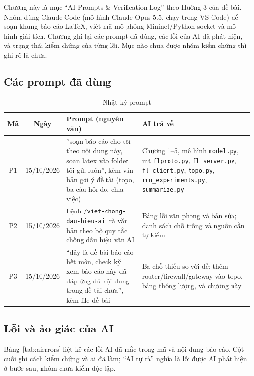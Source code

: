 \setcounter{section}{6}
\setcounter{equation}{0}
Chương này là mục ``AI Prompts \& Verification Log'' theo Hướng 3 của đề bài. Nhóm dùng Claude Code (mô hình Claude Opus 5.5, chạy trong VS Code) để soạn khung báo cáo LaTeX, viết mã mô phỏng Mininet/Python socket và mô hình giải tích. Chương ghi lại các prompt đã dùng, các lỗi của AI đã phát hiện, và trạng thái kiểm chứng của từng lỗi. Mục nào chưa được nhóm kiểm chứng thì ghi rõ là chưa.

\subsection{Các prompt đã dùng}
\begin{table}[H]
    \centering
    \caption{Nhật ký prompt}
    \label{tab:prompts}
    \begin{tabularx}{\textwidth}{c c >{\raggedright\arraybackslash\hsize=1.1\hsize}X >{\raggedright\arraybackslash\hsize=0.9\hsize}X}
        \toprule
        \textbf{Mã} & \textbf{Ngày} & \textbf{Prompt (nguyên văn)} & \textbf{AI trả về} \\
        \midrule
        P1 & 15/10/2026 & ``soạn báo cáo cho tôi theo nội dung này, soạn latex vào folder tôi gửi luôn'', kèm văn bản gợi ý đề tài (topo, ba câu hỏi đo, chia việc) & Chương 1--5, mô hình \texttt{model.py}, mã \texttt{flproto.py}, \texttt{fl\_server.py}, \texttt{fl\_client.py}, \texttt{topo.py}, \texttt{run\_experiments.py}, \texttt{summarize.py} \\
        \midrule
        P2 & 15/10/2026 & Lệnh \texttt{/viet-chong-dau-hieu-ai}: rà văn bản theo bộ quy tắc chống dấu hiệu văn AI & Bảng lỗi văn phong và bản sửa; danh sách chỗ trống và nguồn cần tự kiểm \\
        \midrule
        P3 & 15/10/2026 & ``đây là đề bài báo cáo hết môn, check kỹ xem báo cáo này đã đáp ứng đủ nội dung trong đề tài chưa'', kèm file đề bài & Ba chỗ thiếu so với đề; thêm router/firewall/gateway vào topo, bảng thông lượng, và chương này \\
        \bottomrule
    \end{tabularx}
\end{table}

\subsection{Lỗi và ảo giác của AI}
Bảng~\ref{tab:aierrors} liệt kê các lỗi AI đã mắc trong mã và nội dung báo cáo. Cột cuối ghi cách kiểm chứng và ai đã làm; ``AI tự rà'' nghĩa là lỗi được AI phát hiện ở bước sau, nhóm chưa kiểm độc lập.

